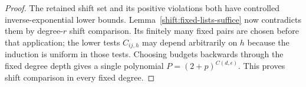 \begin{proof}
The retained shift set and its positive violations both have
controlled inverse-exponential lower bounds.
Lemma~\ref{shift:fixed-lists-suffice} now contradicts them by
degree-$r$ shift comparison.  Its finitely many fixed pairs are
chosen before that application; the lower tests $C_{ij,h}$ may
depend arbitrarily on $h$ because the induction is uniform in
those tests.  Choosing budgets backwards through the fixed degree
depth gives a single polynomial $P=(2+p)^{C(d,\epsilon)}$.
This proves shift comparison in every fixed degree.
\end{proof}
